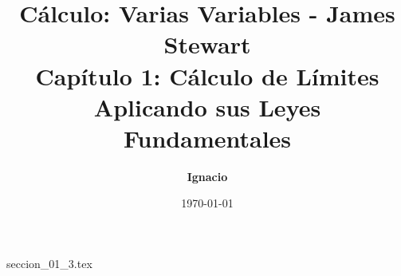\documentclass[11pt,spanish,oneside]{report}
\title{\textbf{Cálculo: Varias Variables - James Stewart} \\ \Large Capítulo 1: Cálculo de Límites Aplicando sus Leyes Fundamentales}
\author{\textbf{Ignacio}}
\date{\today}
\begin{document}
\maketitle

{seccion_01_3.tex}
\end{document}
